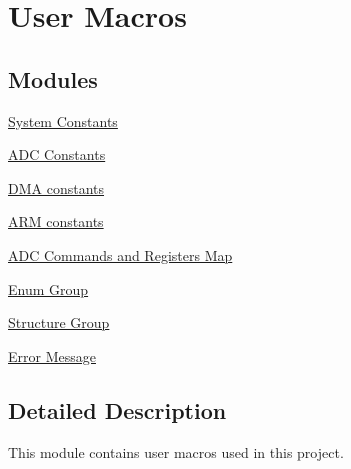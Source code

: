 \hypertarget{group___user_macros}{\section{User Macros}
\label{group___user_macros}
}
\subsection*{Modules}
\begin{DoxyCompactItemize}
\item 
\hyperlink{group___sys_const}{System Constants}
\item 
\hyperlink{group___a_d_c_const}{A\-D\-C Constants}
\item 
\hyperlink{group___d_m_a_const}{D\-M\-A constants}
\item 
\hyperlink{group___a_r_m_const}{A\-R\-M constants}
\item 
\hyperlink{group___a_d_c_cmd_reg}{A\-D\-C Commands and Registers Map}
\item 
\hyperlink{group___enum_grp}{Enum Group}
\item 
\hyperlink{group___strc_grp}{Structure Group}
\item 
\hyperlink{group___err_msg}{Error Message}
\end{DoxyCompactItemize}


\subsection{Detailed Description}
This module contains user macros used in this project. 
